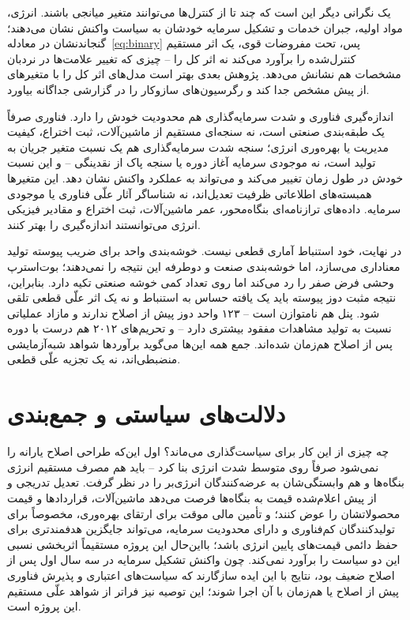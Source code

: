 \documentclass[11pt]{article}
\begin{document}
یک نگرانی دیگر این است که چند تا از کنترل‌ها می‌توانند متغیر میانجی باشند. انرژی، مواد اولیه، جبران خدمات و تشکیل سرمایه خودشان به سیاست واکنش نشان می‌دهند؛ گنجاندنشان در معادله~\eqref{eq:binary} پس، تحت مفروضات قوی، یک اثر مستقیم کنترل‌شده را برآورد می‌کند نه اثر کل را -- چیزی که تغییر علامت‌ها در نردبان مشخصات هم نشانش می‌دهد. پژوهش بعدی بهتر است مدل‌های اثر کل را با متغیرهای از پیش مشخص جدا کند و رگرسیون‌های سازوکار را در گزارشی جداگانه بیاورد.

اندازه‌گیری فناوری و شدت سرمایه‌گذاری هم محدودیت خودش را دارد. فناوری صرفاً یک طبقه‌بندی صنعتی  است، نه سنجه‌ای مستقیم از ماشین‌آلات، ثبت اختراع، کیفیت مدیریت یا بهره‌وری انرژی؛ سنجه شدت سرمایه‌گذاری هم یک نسبت متغیر جریان به تولید است، نه موجودی سرمایه آغاز دوره یا سنجه پاک از نقدینگی -- و این نسبت خودش در طول زمان تغییر می‌کند و می‌تواند به عملکرد واکنش نشان دهد. این متغیرها همبسته‌های اطلاعاتی ظرفیت تعدیل‌اند، نه شناساگر آثار علّی فناوری یا موجودی سرمایه. داده‌های ترازنامه‌ای بنگاه‌محور، عمر ماشین‌آلات، ثبت اختراع و مقادیر فیزیکی انرژی می‌توانستند اندازه‌گیری را بهتر کنند.

در نهایت، خود استنباط آماری قطعی نیست. خوشه‌بندی واحد برای ضریب پیوسته تولید معناداری می‌سازد، اما خوشه‌بندی صنعت و دوطرفه این نتیجه را نمی‌دهند؛ بوت‌استرپ وحشی فرض صفر را رد می‌کند اما روی تعداد کمی خوشه صنعتی تکیه دارد. بنابراین، نتیجه مثبت دوز پیوسته باید یک یافته حساس به استنباط و نه یک اثر علّی قطعی تلقی شود. پنل هم نامتوازن است -- ۱۲۳ واحد دوز پیش از اصلاح ندارند و مازاد عملیاتی نسبت به تولید مشاهدات مفقود بیشتری دارد -- و تحریم‌های ۲۰۱۲ هم درست با دوره پس از اصلاح هم‌زمان شده‌اند. جمع همه این‌ها می‌گوید برآوردها شواهد شبه‌آزمایشی منضبطی‌اند، نه یک تجزیه علّی قطعی.

\section{دلالت‌های سیاستی و جمع‌بندی}

چه چیزی از این کار برای سیاست‌گذاری می‌ماند؟ اول این‌که طراحی اصلاح یارانه را نمی‌شود صرفاً روی متوسط شدت انرژی بنا کرد -- باید هم مصرف مستقیم انرژی بنگاه‌ها و هم وابستگی‌شان به عرضه‌کنندگان انرژی‌بر را در نظر گرفت. تعدیل تدریجی و از پیش اعلام‌شده قیمت به بنگاه‌ها فرصت می‌دهد ماشین‌آلات، قراردادها و قیمت محصولاتشان را عوض کنند؛ و تأمین مالی موقت برای ارتقای بهره‌وری، مخصوصاً برای تولیدکنندگان کم‌فناوری و دارای محدودیت سرمایه، می‌تواند جایگزین هدفمندتری برای حفظ دائمی قیمت‌های پایین انرژی باشد؛ بااین‌حال این پروژه مستقیماً اثربخشی نسبی این دو سیاست را برآورد نمی‌کند. چون واکنش تشکیل سرمایه در سه سال اول پس از اصلاح ضعیف بود، نتایج با این ایده سازگارند که سیاست‌های اعتباری و پذیرش فناوری پیش از اصلاح یا هم‌زمان با آن اجرا شوند؛ این توصیه نیز فراتر از شواهد علّی مستقیم این پروژه است.
\end{document}
